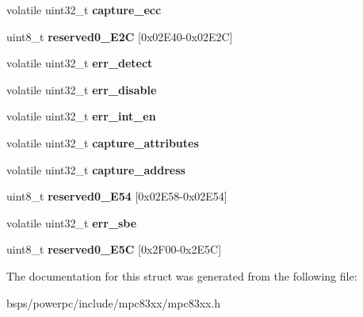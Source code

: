 \begin{DoxyCompactItemize}
volatile uint32\+\_\+t {\bfseries capture\+\_\+ecc}
\item 
\mbox{\label{structm83xxDDRRegisters___a94d596e3121daedfa996d4ee9fbcc9a4}} 
uint8\+\_\+t {\bfseries reserved0\+\_\+E2C} \mbox{[}0x02\+E40-\/0x02\+E2\+C\mbox{]}
\item 
\mbox{\label{structm83xxDDRRegisters___a8310ca698f37f531790d8e424a6015c7}} 
volatile uint32\+\_\+t {\bfseries err\+\_\+detect}
\item 
\mbox{\label{structm83xxDDRRegisters___af32bde80267c7600aa84bbfc6f390256}} 
volatile uint32\+\_\+t {\bfseries err\+\_\+disable}
\item 
\mbox{\label{structm83xxDDRRegisters___ac5940ce938636653d42c49118cc1753c}} 
volatile uint32\+\_\+t {\bfseries err\+\_\+int\+\_\+en}
\item 
\mbox{\label{structm83xxDDRRegisters___a3df76bd89995f1578899b14def1821b5}} 
volatile uint32\+\_\+t {\bfseries capture\+\_\+attributes}
\item 
\mbox{\label{structm83xxDDRRegisters___a510d2589548ab449691a639f736a8817}} 
volatile uint32\+\_\+t {\bfseries capture\+\_\+address}
\item 
\mbox{\label{structm83xxDDRRegisters___affbcf316585b19e7de810e412e082e9b}} 
uint8\+\_\+t {\bfseries reserved0\+\_\+E54} \mbox{[}0x02\+E58-\/0x02\+E54\mbox{]}
\item 
\mbox{\label{structm83xxDDRRegisters___a02c411a5ac99e9e9b25603bcad1fca53}} 
volatile uint32\+\_\+t {\bfseries err\+\_\+sbe}
\item 
\mbox{\label{structm83xxDDRRegisters___afad69b4df6224fbf14daf97237243453}} 
uint8\+\_\+t {\bfseries reserved0\+\_\+E5C} \mbox{[}0x2\+F00-\/0x2\+E5\+C\mbox{]}
\end{DoxyCompactItemize}


The documentation for this struct was generated from the following file\+:\begin{DoxyCompactItemize}
\item 
bsps/powerpc/include/mpc83xx/mpc83xx.\+h\end{DoxyCompactItemize}
